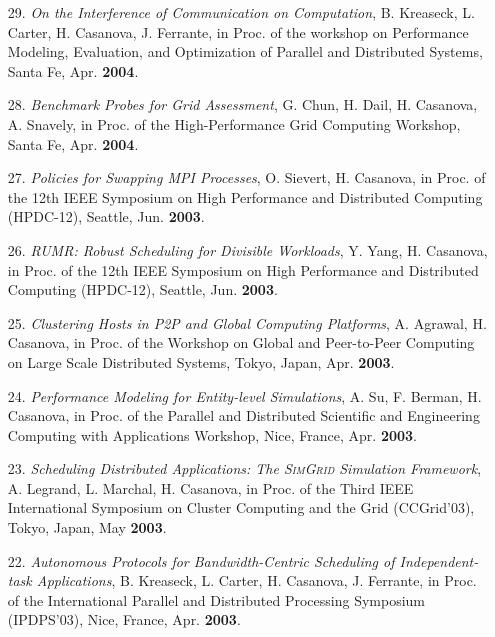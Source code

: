 \begin{enumerate}
\item [29.]
{\it On the Interference of Communication on Computation}, B. Kreaseck,
L. Carter, H. Casanova, J. Ferrante, in Proc. of the workshop
on Performance Modeling, Evaluation, and Optimization of Parallel and
Distributed Systems, Santa Fe, Apr. {\bf 2004}.

\item [28.]
{\it Benchmark Probes for Grid Assessment}, G. Chun, H. Dail, H. Casanova,
A. Snavely, in Proc. of the High-Performance Grid Computing
Workshop, Santa Fe, Apr. {\bf 2004}.

\item [27.]
{\it Policies for Swapping MPI Processes}, O. Sievert, H. Casanova,
in Proc. of the 12th IEEE Symposium on High Performance and
Distributed Computing (HPDC-12), Seattle, Jun. {\bf 2003}.


\item [26.]
{\it RUMR: Robust Scheduling for Divisible Workloads}, Y. Yang,
H. Casanova, in Proc. of the 12th IEEE Symposium on High Performance
and Distributed Computing (HPDC-12), Seattle, Jun. {\bf 2003}.

\item [25.] 
{\it Clustering Hosts in P2P and Global Computing Platforms}, A. Agrawal,
H. Casanova, in Proc. of the Workshop on Global and Peer-to-Peer
Computing on Large Scale Distributed Systems, Tokyo, Japan, Apr.
{\bf 2003}.


\item [24.]
{\it Performance Modeling for Entity-level Simulations}, A. Su, F. Berman,
H. Casanova, in Proc. of the Parallel and Distributed Scientific
and Engineering Computing with Applications Workshop, Nice, France,
Apr. {\bf 2003}.

\item [23.]
{\it Scheduling Distributed Applications: The \textsc{SimGrid} Simulation
Framework}, A. Legrand, L. Marchal, H. Casanova, in Proc. of the
Third IEEE International Symposium on Cluster Computing and the Grid
(CCGrid'03), Tokyo, Japan, May {\bf 2003}.


\item[22.]
{\it Autonomous Protocols for Bandwidth-Centric Scheduling of
Independent-task Applications}, B. Kreaseck, L. Carter, H. Casanova,
J. Ferrante, in Proc. of the International Parallel and Distributed
Processing Symposium (IPDPS'03), Nice, France, Apr. {\bf 2003}.


\end{enumerate}
